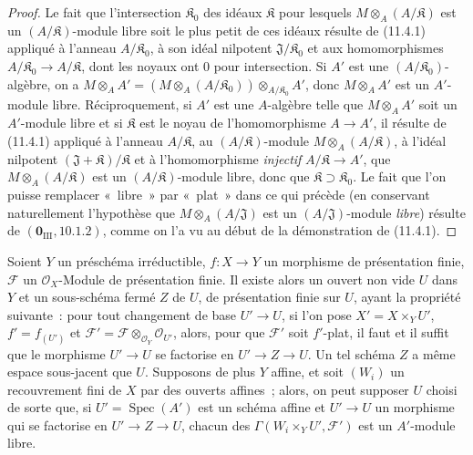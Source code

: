 \begin{proof}
Le fait que l'intersection $\mathfrak K_0$ des idéaux $\mathfrak K$ pour
lesquels $M\otimes_A(A/\mathfrak K)$ est un $(A/\mathfrak K)$-module libre
soit le plus petit de ces idéaux résulte de (11.4.1) appliqué à l'anneau
$A/\mathfrak K_0$, à son idéal nilpotent $\mathfrak J/\mathfrak K_0$ et aux
homomorphismes $A/\mathfrak K_0\to A/\mathfrak K$, dont les noyaux ont $0$
pour intersection. Si $A'$ est une $(A/\mathfrak K_0)$-algèbre, on a
$M\otimes_A A'=
(M\otimes_A(A/\mathfrak K_0))\otimes_{A/\mathfrak K_0}A'$,
donc $M\otimes_A A'$ est un $A'$-module libre. Réciproquement, si $A'$ est
une $A$-algèbre telle que $M\otimes_A A'$ soit un $A'$-module libre et si
$\mathfrak K$ est le noyau de l'homomorphisme $A\to A'$, il résulte de
(11.4.1) appliqué à l'anneau $A/\mathfrak K$, au
$(A/\mathfrak K)$-module $M\otimes_A(A/\mathfrak K)$, à l'idéal nilpotent
$(\mathfrak J+\mathfrak K)/\mathfrak K$ et à l'homomorphisme \emph{injectif}
$A/\mathfrak K\to A'$, que $M\otimes_A(A/\mathfrak K)$ est un
$(A/\mathfrak K)$-module libre, donc que $\mathfrak K\supset\mathfrak K_0$.
Le fait que l'on puisse remplacer «~libre~» par «~plat~» dans ce qui précède
(en conservant naturellement l'hypothèse que $M\otimes_A(A/\mathfrak J)$ est
un $(A/\mathfrak J)$-module \emph{libre}) résulte de
$(\mathbf 0_{\mathrm{III}},10.1.2)$, comme on l'a vu au début de la
démonstration de (11.4.1).
\end{proof}

\begin{proposition}[11.4.5]
\label{IV.11.4.5-fr}
Soient $Y$ un préschéma irréductible, $f:X\to Y$ un morphisme de présentation
finie, $\mathcal F$ un $\mathcal O_X$-Module de présentation finie. Il existe
alors un ouvert non vide $U$ dans $Y$ et un sous-schéma fermé $Z$ de $U$, de
présentation finie sur $U$, ayant la propriété suivante~: pour tout changement
de base $U'\to U$, si l'on pose $X'=X\times_YU'$, $f'=f_{(U')}$ et
$\mathcal F'=\mathcal F\otimes_{\mathcal O_Y}\mathcal O_{U'}$, alors, pour que
$\mathcal F'$ soit $f'$-plat, il faut et il suffit que le morphisme $U'\to U$
se factorise en $U'\to Z\to U$. Un tel schéma $Z$ a même espace sous-jacent que
$U$. Supposons de plus $Y$ affine, et soit $(W_i)$ un recouvrement fini de $X$
par des ouverts affines~; alors, on peut supposer $U$ choisi de sorte que, si
$U'=\operatorname{Spec}(A')$ est un schéma affine et $U'\to U$ un morphisme qui
se factorise en $U'\to Z\to U$, chacun des
$\Gamma(W_i\times_YU',\mathcal F')$ est un $A'$-module libre.
\end{proposition}

